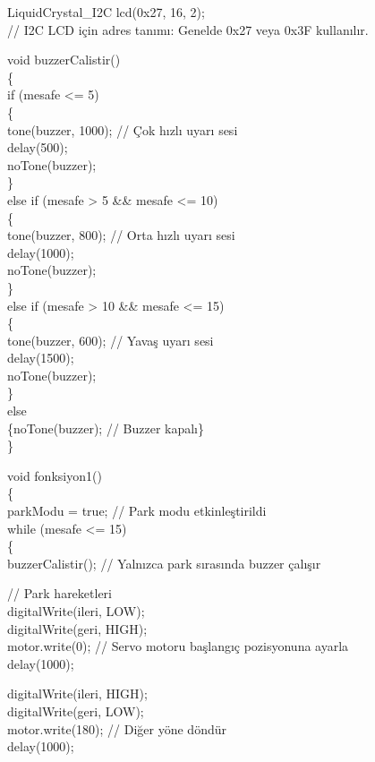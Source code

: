 LiquidCrystal\_I2C lcd(0x27, 16, 2);\\
// I2C LCD için adres tanımı: Genelde 0x27 veya 0x3F kullanılır.

void buzzerCalistir()\\ 
\{\\
    if (mesafe <= 5)\\
    \{\\
    tone(buzzer, 1000); // Çok hızlı uyarı sesi\\
    delay(500);\\
    noTone(buzzer);\\
    \}\\
    else if (mesafe > 5 \&\& mesafe <= 10)\\
    \{\\
    tone(buzzer, 800); // Orta hızlı uyarı sesi\\
    delay(1000);\\
    noTone(buzzer);\\
    \}\\ 
    else if (mesafe > 10 \&\& mesafe <= 15)\\ 
    \{\\
    tone(buzzer, 600); // Yavaş uyarı sesi\\
    delay(1500);\\
    noTone(buzzer);\\
    \}\\ 
    else\\ 
    \{noTone(buzzer); // Buzzer kapalı\}\\
\}

void fonksiyon1()\\
\{\\
  parkModu = true; // Park modu etkinleştirildi\\
  while (mesafe <= 15)\\
  \{\\
    buzzerCalistir(); // Yalnızca park sırasında buzzer çalışır

    // Park hareketleri\\
    digitalWrite(ileri, LOW);\\
    digitalWrite(geri, HIGH);\\
    motor.write(0); // Servo motoru başlangıç pozisyonuna ayarla\\
    delay(1000);

    digitalWrite(ileri, HIGH);\\
    digitalWrite(geri, LOW);\\
    motor.write(180); // Diğer yöne döndür\\
    delay(1000);

